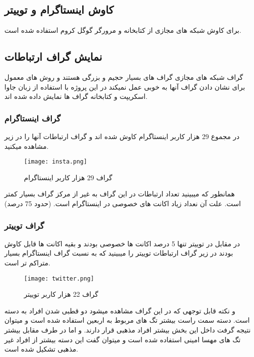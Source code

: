 \documentclass[12pt]{article}
\begin{document}
\subsection{کاوش اینستاگرام و توییتر}
برای کاوش شبکه های مجازی از کتابخانه 
و مرورگر گوگل کروم استفاده شده است.
\cite{sel}


\subsection{نمایش گراف ارتباطات}
گراف شبکه های مجازی گراف های بسیار حجیم و بزرگی هستند و روش های معمول برای نشان دادن گراف آنها به خوبی عمل نمیکند در این پروژه با استفاده از زبان جاوا اسکریپت و کتابخانه 
گراف ها نمایش داده شده اند.
\cite{d3}

\subsubsection{گراف اینستاگرام}
در مجموع 29 هزار کاربر اینستاگرام کاوش شده اند و گراف ارتباطات آنها را در زیر مشاهده میکنید.

\begin{figure}[htbp]
\centering
\texttt{[image: insta.png]}
\caption{گراف 29 هزار کاربر اینستاگرام}
\end{figure}


همانطور که میبینید تعداد ارتباطات در این گراف به غیر از مرکز گراف بسیار کمتر است.
علت آن نعداد زیاد اکانت های خصوصی در اینستاگرام است. (حدود 75 درصد)




\subsubsection{گراف توییتر}
در مقابل در توییتر تنها 5 درصد اکانت ها خصوصی بودند و بقیه اکانت ها قابل کاوش بودند در زیر گراف ارتباطات توییتر را 
میبینید که به نسبت گراف اینستاگرام بسیار متراکم تر است.

\begin{figure}[htbp]
\centering
\texttt{[image: twitter.png]}
\caption{گراف 22 هزار کاربر توییتر}
\end{figure}

و نکته قابل توجهی که در این گراف مشاهده میشود دو قطبی شدن افراد به دسته است.
دسته سمت راست بیشتر تگ های مربوط به اربعین استفاده شده است و میتوان نتیجه گرفت داخل این بخش بیشتر افراد مذهبی قرار دارند. و اما در طرف مقابل بیشتر تگ های مهسا امینی استفاده شده است و میتوان گفت این دسته بیشتر از افراد غیر مذهبی تشکیل شده است.
\end{document}
